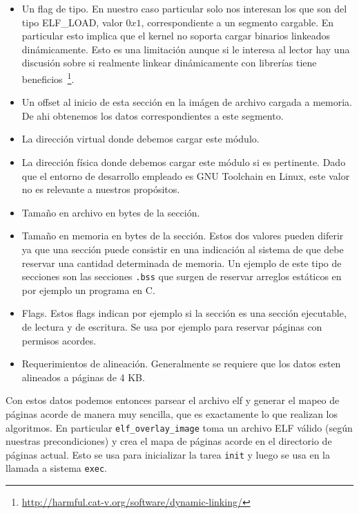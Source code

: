 \begin{itemize}
	\begin{itemize}
		\item Un flag de tipo. En nuestro caso particular solo nos interesan los que son del tipo ELF\_LOAD, valor $0x1$, correspondiente
		a un segmento cargable. En particular esto implica que el kernel no soporta cargar binarios linkeados din\'amicamente. Esto es una
		limitaci\'on aunque si le interesa al lector hay una discusi\'on sobre si realmente linkear din\'amicamente con librer\'ias tiene
		beneficios~\footnote{\url{http://harmful.cat-v.org/software/dynamic-linking/}}.	
		\item Un offset al inicio de esta secci\'on en la im\'agen de archivo cargada a memoria. De ahi obtenemos los datos correspondientes
		a este segmento.
		\item La direcci\'on virtual donde debemos cargar este m\'odulo. 
		\item La direcci\'on f\'isica donde debemos cargar este m\'odulo si es pertinente. Dado que el entorno de desarrollo empleado es GNU
		Toolchain en Linux, este valor no es relevante a nuestros prop\'ositos.
		\item Tama\~no en archivo en bytes de la secci\'on.
		\item Tama\~no en memoria en bytes de la secci\'on. Estos dos valores pueden diferir ya que una secci\'on puede consistir en una
		indicaci\'on al sistema de que debe reservar una cantidad determinada de memoria. Un ejemplo de este tipo de secciones son las
		secciones \texttt{.bss} que surgen de reservar arreglos est\'aticos en por ejemplo un programa en C.
		\item Flags. Estos flags indican por ejemplo si la secci\'on es una secci\'on ejecutable, de lectura y de escritura. Se usa por
		ejemplo para reservar p\'aginas con permisos acordes.
		\item Requerimientos de alineaci\'on. Generalmente se requiere que los datos esten alineados a p\'aginas de 4 KB.
	\end{itemize}
\end{itemize}

	Con estos datos podemos entonces parsear el archivo elf y generar el mapeo de p\'aginas acorde de manera muy sencilla, que es exactamente
	lo que realizan los algoritmos. En particular \texttt{elf\_overlay\_image} toma un archivo ELF v\'alido (seg\'un nuestras precondiciones)
	y crea el mapa de p\'aginas acorde en el directorio de p\'aginas actual. Esto se usa para inicializar la tarea \texttt{init} y luego se
	usa en la llamada a sistema \texttt{exec}.
	
